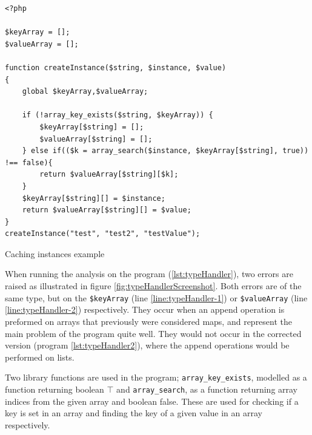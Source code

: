 \begin{program}
\begin{lstlisting}
<?php

$keyArray = [];
$valueArray = [];

function createInstance($string, $instance, $value)
{
    global $keyArray,$valueArray;

    if (!array_key_exists($string, $keyArray)) {
        $keyArray[$string] = [];
        $valueArray[$string] = [];
    } else if(($k = array_search($instance, $keyArray[$string], true)) !== false){
        return $valueArray[$string][$k];
    }
    $keyArray[$string][] = $instance;
    return $valueArray[$string][] = $value;
}
createInstance("test", "test2", "testValue");
\end{lstlisting}
\caption{Caching instances example}
\label{lst:typeHandler2}
\end{program}

When running the analysis on the program (\ref{lst:typeHandler}), two errors are raised as illustrated in figure \ref{fig:typeHandlerScreenshot}. Both errors are of the same type, but on the \texttt{\$keyArray} (line \ref{line:typeHandler-1}) or \texttt{\$valueArray} (line \ref{line:typeHandler-2}) respectively. They occur when an append operation is preformed on arrays that previously were considered maps, and represent the main problem of the program quite well. They would not occur in the corrected version (program \ref{lst:typeHandler2}), where the append operations would be performed on lists.

Two library functions are used in the program; \texttt{array\_key\_exists}, modelled as a function returning boolean $\top$ and \texttt{array\_search}, as a function returning array indices from the given array and boolean false. These are used for checking if a key is set in an array and finding the key of a given value in an array respectively.

